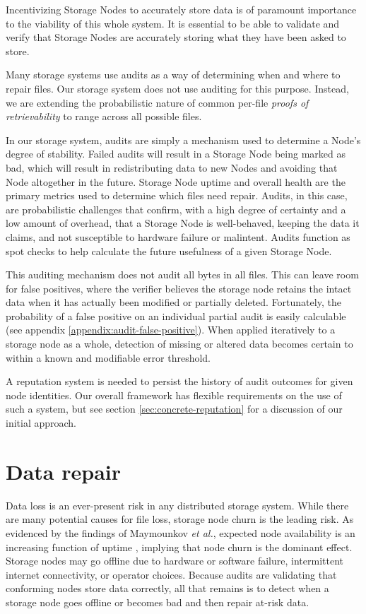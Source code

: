 \documentclass[8pt,fleqn,openany]{book}
\begin{document}
Incentivizing Storage Nodes to accurately store data is of paramount importance
to
the viability of this whole system. It is essential to be able to
validate and verify that Storage Nodes are accurately storing what they have
been
asked to store.

Many storage systems use audits as a way of determining when and where to repair
files. Our storage system does not use auditing for this purpose.
Instead, we are extending the probabilistic nature of
common per-file {\em proofs of retrievability} \cite{proof-of-retrievability}
to range across all possible files.

In our storage system,
audits are simply a mechanism used to determine a Node's degree of stability.
Failed audits will result in a Storage Node being marked as bad, which
will result in redistributing data to new Nodes and avoiding that Node altogether
in the future. Storage Node uptime and overall health are the primary metrics
used to determine which files need repair.
Audits, in this case, are probabilistic challenges that confirm, with a high
degree of certainty and a low amount of overhead, that a Storage Node is well-behaved, keeping the data it claims, and not susceptible to hardware
failure or malintent. Audits function as spot checks to help calculate
the future usefulness of a given Storage Node.

This auditing mechanism does not audit all bytes in all files. This can
leave room for false positives, where the verifier believes the storage node
retains the intact data when it has actually been modified or partially
deleted. Fortunately, the probability of a false positive on an individual
partial audit is easily calculable (see appendix
\ref{appendix:audit-false-positive}). When applied
iteratively to a storage node as a whole, detection of missing or altered data
becomes certain to within a known and modifiable error threshold.

A reputation system is needed to persist the history of audit outcomes for
given node identities. Our overall framework has flexible requirements on the use
of such a system, but see section \ref{sec:concrete-reputation} for a
discussion of our initial approach.

\section{Data repair}

Data loss is an ever-present risk in any distributed storage system. While there
are many potential causes for file loss, storage node churn is the leading
risk. As evidenced by the findings of Maymounkov {\em et al.}, expected node
availability is an increasing function of uptime \cite{kad}, implying that node
churn is the dominant effect. Storage nodes
may go offline due to hardware or software failure, intermittent internet
connectivity, or operator choices.
Because audits are validating that conforming nodes store data correctly, all
that remains is to detect when a storage node goes offline or becomes bad and
then repair at-risk data.
\end{document}
